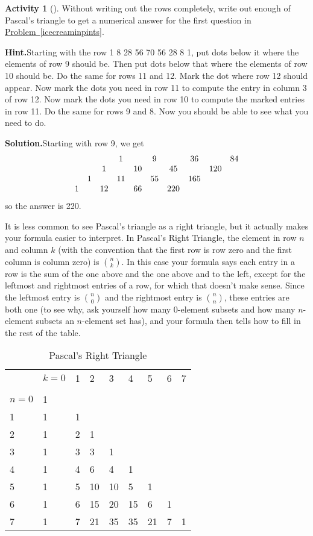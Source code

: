 \documentclass[10pt,]{book}
\theoremstyle{plain}
\theoremstyle{definition}
\newtheorem{activity}[project]{Activity}
\numberwithin{equation}{chapter}
\newcommand{\hrulethin}  {\noalign{\hrule height 0.04em}}
\newcommand{\amp}{&}
\begin{document}
\begin{activity}[]\label{activity-31}
Without writing out the rows completely, write out enough of Pascal's triangle to get a numerical answer for the first question in \hyperref[icecreaminpints]{Problem~\ref{icecreaminpints}}.%
\par\medskip\noindent%
\textbf{Hint.}\quad Starting with the row 1 8 28 56 70 56 28 8 1, put dots below it where the elements of row 9 should be. Then put dots below that where the elements of row 10 should be. Do the same for rows 11 and 12. Mark the dot where row 12 should appear. Now mark the dots you need in row 11 to compute the entry in column 3 of row 12. Now mark the dots you need in row 10 to compute the marked entries in row 11. Do the same for rows 9 and 8. Now you should be able to see what you need to do.%
\par\medskip\noindent%
\textbf{Solution.}\quad Starting with row 9, we get%
\begin{equation*}
\begin{matrix}\amp \amp \amp 1\amp \amp 9\amp \amp 36\amp \amp 84 \cr\amp \amp 1\amp \amp 10\amp \amp 45\amp \amp 120\cr\amp 1\amp \amp 11\amp \amp 55\amp \amp 165\cr
1\amp \amp 12\amp \amp 66\amp \amp 220
\end{matrix}
\end{equation*}
so the answer is 220.%
\end{activity}
It is less common to see Pascal's triangle as a right triangle, but it actually makes your formula easier to interpret. In Pascal's Right Triangle, the element in row \(n\) and column \(k\) (with the convention that the first row is row zero and the first column is column zero) is \(\binom{n}{k}\). In this case your formula says each entry in a row is the sum of the one above and the one above and to the left, except for the leftmost and rightmost entries of a row, for which that doesn't make sense. Since the leftmost entry is \(\binom{n}{0}\) and the rightmost entry is \(\binom{n}{n}\), these entries are both one (to see why, ask yourself how many \(0\)-element subsets and how many \(n\)-element subsets an \(n\)-element set has), and your formula then tells how to fill in the rest of the table.%
\begin{table}
\centering
\begin{tabular}{lllllllll}
&\(k=0\)&1&2&3&4&5&6&7\tabularnewline[0pt]
&&&&&&&&\tabularnewline\hrulethin
\(n=0\)&1&&&&&&\tabularnewline[0pt]
1&1&1&&&&&\tabularnewline[0pt]
2&1&2&1&&&&&\tabularnewline[0pt]
3&1&3&3&1&&&&\tabularnewline[0pt]
4&1&4&6&4&1&&&\tabularnewline[0pt]
5&1&5&10&10&5&1&&\tabularnewline[0pt]
6&1&6&15&20&15&6&1&\tabularnewline[0pt]
7&1&7&21&35&35&21&7&1
\end{tabular}
\caption{Pascal's Right Triangle\label{Pascalrighttriangle}}
\end{table}
\end{document}
